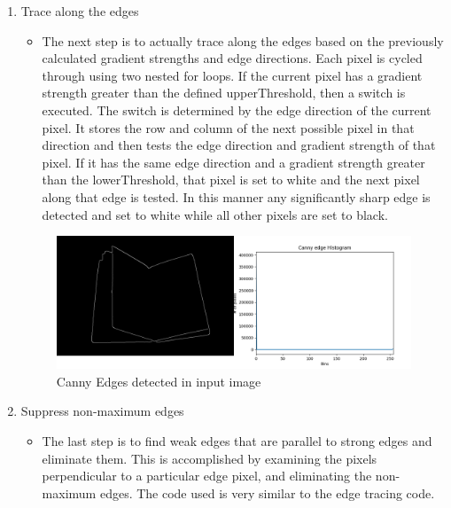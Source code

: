 \documentclass[BTech]{srmuthesis}
\begin{document}
\begin{enumerate}
\begin{itemize}
    \end{itemize}
    \item Trace along the edges
    \\
    \begin{itemize}
        \item The next step is to actually trace along the edges based on the previously calculated gradient strengths and edge directions. Each pixel is cycled through using two nested for loops. If the current pixel has a gradient strength greater than the defined upperThreshold, then a switch is executed. The switch is determined by the edge direction of the current pixel. It stores the row and column of the next possible pixel in that direction and then tests the edge direction and gradient strength of that pixel. If it has the same edge direction and a gradient strength greater than the lowerThreshold, that pixel is set to white and the next pixel along that edge is tested. In this manner any significantly sharp edge is detected and set to white while all other pixels are set to black.
    \end{itemize}
    \begin{figure}[h!]
        \centering
        \includegraphics[width=15cm\textwidth]{win_frnds_blue_canny_hist}
        \caption{Canny Edges detected in input image}
        \label{fig:Canny Edges detected in input image}
    \end{figure}
    \item Suppress non-maximum edges
    \\
    \begin{itemize}
        \item The last step is to find weak edges that are parallel to strong edges and eliminate them. This is accomplished by examining the pixels perpendicular to a particular edge pixel, and eliminating the non-maximum edges. The code used is very similar to the edge tracing code.
    \end{itemize}
\end{enumerate}
\end{document}
